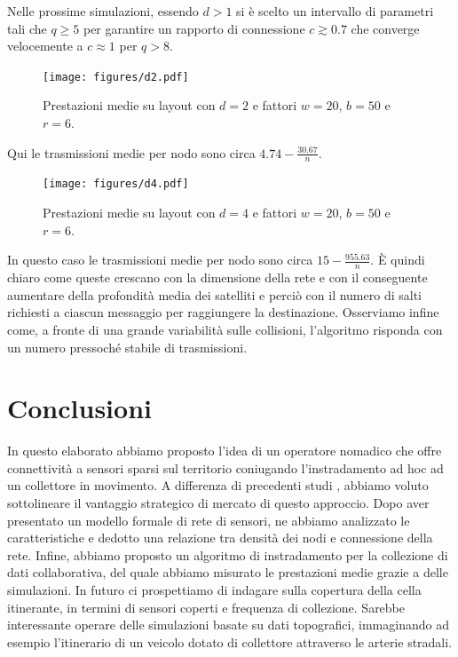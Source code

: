\documentclass[a4paper,11pt]{article}
\theoremstyle{definition}
\begin{document}
Nelle prossime simulazioni, essendo $d>1$ si è scelto un intervallo di parametri tali che $q \geq 5$ per garantire un rapporto di connessione $c \gtrsim 0.7$ che converge velocemente a $c \approx 1$ per $q > 8$.

\begin{figure}[H]
\centering
\texttt{[image: figures/d2.pdf]}
\caption{Prestazioni medie su layout con $d=2$ e fattori $w=20$, $b=50$ e $r=6$.}
\end{figure}

Qui le trasmissioni medie per nodo sono circa $4.74 - \frac{30.67}{n}$.

\begin{figure}[H]
\centering
\texttt{[image: figures/d4.pdf]}
\caption{Prestazioni medie su layout con $d=4$ e fattori $w=20$, $b=50$ e $r=6$.}
\end{figure}

In questo caso le trasmissioni medie per nodo sono circa $15 - \frac{955.63}{n}$. È quindi chiaro come queste crescano con la dimensione della rete e con il conseguente aumentare della profondità media dei satelliti e perciò con il numero di salti richiesti a ciascun messaggio per raggiungere la destinazione. Osserviamo infine come, a fronte di una grande variabilità sulle collisioni, l'algoritmo risponda con un numero pressoché stabile di trasmissioni.

\section{Conclusioni}

In questo elaborato abbiamo proposto l'idea di un operatore nomadico che offre connettività a sensori sparsi sul territorio coniugando l'instradamento ad hoc ad un collettore in movimento. A differenza di precedenti studi \cite{moblife1, moblife2}, abbiamo voluto sottolineare il vantaggio strategico di mercato di questo approccio. Dopo aver presentato un modello formale di rete di sensori, ne abbiamo analizzato le caratteristiche e dedotto una relazione tra densità dei nodi e connessione della rete. Infine, abbiamo proposto un algoritmo di instradamento per la collezione di dati collaborativa, del quale abbiamo misurato le prestazioni medie grazie a delle simulazioni. In futuro ci prospettiamo di indagare sulla copertura della cella itinerante, in termini di sensori coperti e frequenza di collezione. Sarebbe interessante operare delle simulazioni basate su dati topografici, immaginando ad esempio l'itinerario di un veicolo dotato di collettore attraverso le arterie stradali.
\end{document}
